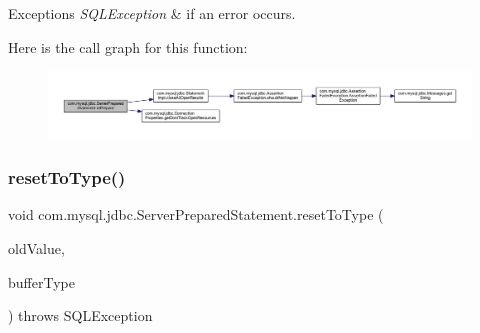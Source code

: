 \begin{DoxyExceptions}{Exceptions}
{\em S\+Q\+L\+Exception} & if an error occurs. \\
\hline
\end{DoxyExceptions}
Here is the call graph for this function\+:
\nopagebreak
\begin{figure}[H]
\begin{center}
\leavevmode
\includegraphics[width=350pt]{classcom_1_1mysql_1_1jdbc_1_1_server_prepared_statement_ac01f8aa54deb0cea5d132b02377feb5b_cgraph}
\end{center}
\end{figure}
\mbox{\label{classcom_1_1mysql_1_1jdbc_1_1_server_prepared_statement_a9752e8c4db0cfe68dba1503bfffb9919}} 
\subsubsection{\texorpdfstring{reset\+To\+Type()}{resetToType()}}
{\footnotesize\ttfamily void com.\+mysql.\+jdbc.\+Server\+Prepared\+Statement.\+reset\+To\+Type (\begin{DoxyParamCaption}\item[{Bind\+Value}]{old\+Value,  }\item[{int}]{buffer\+Type }\end{DoxyParamCaption}) throws S\+Q\+L\+Exception\hspace{0.3cm}{\ttfamily [protected]}}

